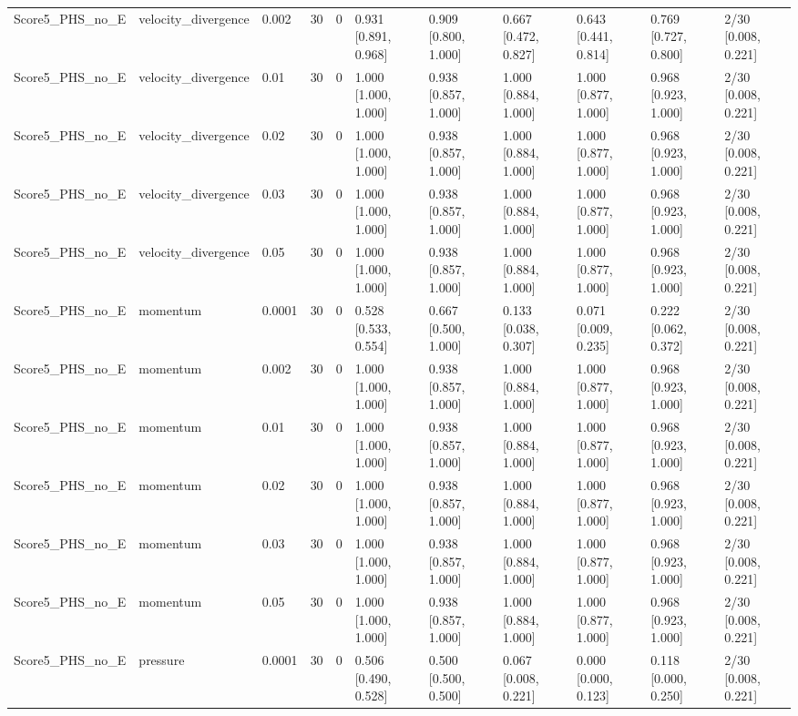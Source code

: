 \begin{longtable}{lllllllllll}
Score5\_PHS\_no\_E & velocity\_divergence & 0.002 & 30 & 0 & 0.931 [0.891, 0.968] & 0.909 [0.800, 1.000] & 0.667 [0.472, 0.827] & 0.643 [0.441, 0.814] & 0.769 [0.727, 0.800] & 2/30 [0.008, 0.221] \\
Score5\_PHS\_no\_E & velocity\_divergence & 0.01 & 30 & 0 & 1.000 [1.000, 1.000] & 0.938 [0.857, 1.000] & 1.000 [0.884, 1.000] & 1.000 [0.877, 1.000] & 0.968 [0.923, 1.000] & 2/30 [0.008, 0.221] \\
Score5\_PHS\_no\_E & velocity\_divergence & 0.02 & 30 & 0 & 1.000 [1.000, 1.000] & 0.938 [0.857, 1.000] & 1.000 [0.884, 1.000] & 1.000 [0.877, 1.000] & 0.968 [0.923, 1.000] & 2/30 [0.008, 0.221] \\
Score5\_PHS\_no\_E & velocity\_divergence & 0.03 & 30 & 0 & 1.000 [1.000, 1.000] & 0.938 [0.857, 1.000] & 1.000 [0.884, 1.000] & 1.000 [0.877, 1.000] & 0.968 [0.923, 1.000] & 2/30 [0.008, 0.221] \\
Score5\_PHS\_no\_E & velocity\_divergence & 0.05 & 30 & 0 & 1.000 [1.000, 1.000] & 0.938 [0.857, 1.000] & 1.000 [0.884, 1.000] & 1.000 [0.877, 1.000] & 0.968 [0.923, 1.000] & 2/30 [0.008, 0.221] \\
Score5\_PHS\_no\_E & momentum & 0.0001 & 30 & 0 & 0.528 [0.533, 0.554] & 0.667 [0.500, 1.000] & 0.133 [0.038, 0.307] & 0.071 [0.009, 0.235] & 0.222 [0.062, 0.372] & 2/30 [0.008, 0.221] \\
Score5\_PHS\_no\_E & momentum & 0.002 & 30 & 0 & 1.000 [1.000, 1.000] & 0.938 [0.857, 1.000] & 1.000 [0.884, 1.000] & 1.000 [0.877, 1.000] & 0.968 [0.923, 1.000] & 2/30 [0.008, 0.221] \\
Score5\_PHS\_no\_E & momentum & 0.01 & 30 & 0 & 1.000 [1.000, 1.000] & 0.938 [0.857, 1.000] & 1.000 [0.884, 1.000] & 1.000 [0.877, 1.000] & 0.968 [0.923, 1.000] & 2/30 [0.008, 0.221] \\
Score5\_PHS\_no\_E & momentum & 0.02 & 30 & 0 & 1.000 [1.000, 1.000] & 0.938 [0.857, 1.000] & 1.000 [0.884, 1.000] & 1.000 [0.877, 1.000] & 0.968 [0.923, 1.000] & 2/30 [0.008, 0.221] \\
Score5\_PHS\_no\_E & momentum & 0.03 & 30 & 0 & 1.000 [1.000, 1.000] & 0.938 [0.857, 1.000] & 1.000 [0.884, 1.000] & 1.000 [0.877, 1.000] & 0.968 [0.923, 1.000] & 2/30 [0.008, 0.221] \\
Score5\_PHS\_no\_E & momentum & 0.05 & 30 & 0 & 1.000 [1.000, 1.000] & 0.938 [0.857, 1.000] & 1.000 [0.884, 1.000] & 1.000 [0.877, 1.000] & 0.968 [0.923, 1.000] & 2/30 [0.008, 0.221] \\
Score5\_PHS\_no\_E & pressure & 0.0001 & 30 & 0 & 0.506 [0.490, 0.528] & 0.500 [0.500, 0.500] & 0.067 [0.008, 0.221] & 0.000 [0.000, 0.123] & 0.118 [0.000, 0.250] & 2/30 [0.008, 0.221] \\

\end{longtable}
